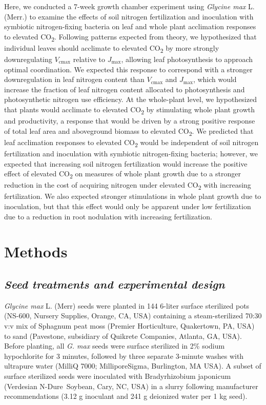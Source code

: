     Here, we conducted a 7-week growth chamber experiment using \textit{Glycine max} L. (Merr.) to examine the effects of soil nitrogen fertilization and inoculation with symbiotic nitrogen-fixing bacteria on leaf and whole plant acclimation responses to elevated CO\textsubscript{2}. Following patterns expected from theory, we hypothesized that individual leaves should acclimate to elevated CO\textsubscript{2} by more strongly downregulating $V_\mathrm{cmax}$ relative to $J_\mathrm{max}$, allowing leaf photosynthesis to approach optimal coordination. We expected this response to correspond with a stronger downregulation in leaf nitrogen content than $V_\mathrm{cmax}$ and $J_\mathrm{max}$, which would increase the fraction of leaf nitrogen content allocated to photosynthesis and photosynthetic nitrogen use efficiency. At the whole-plant level, we hypothesized that plants would acclimate to elevated CO\textsubscript{2} by stimulating whole plant growth and productivity, a response that would be driven by a strong positive response of total leaf area and aboveground biomass to elevated CO\textsubscript{2}. We predicted that leaf acclimation responses to elevated CO\textsubscript{2} would be independent of soil nitrogen fertilization and inoculation with symbiotic nitrogen-fixing bacteria; however, we expected that increasing soil nitrogen fertilization would increase the positive effect of elevated CO\textsubscript{2} on measures of whole plant growth due to a stronger reduction in the cost of acquiring nitrogen under elevated CO\textsubscript{2} with increasing fertilization. We also expected stronger stimulations in whole plant growth due to inoculation, but that this effect would only be apparent under low fertilization due to a reduction in root nodulation with increasing fertilization.

    \section{Methods}

    \subsection{\textit{Seed treatments and experimental design}}

    \textit{Glycine max} L. (Merr) seeds were planted in 144 6-liter surface sterilized pots (NS-600, Nursery Supplies, Orange, CA, USA) containing a steam-sterilized 70:30 v:v mix of Sphagnum peat moss (Premier Horticulture, Quakertown, PA, USA) to sand (Pavestone, subsidiary of Quikrete Companies, Atlanta, GA, USA). Before planting, all \textit{G. max} seeds were surface sterilized in 2\% sodium hypochlorite for 3 minutes, followed by three separate 3-minute washes with ultrapure water (MilliQ 7000; MilliporeSigma, Burlington, MA USA). A subset of surface sterilized seeds were inoculated with Bradyrhizobium japonicum (Verdesian N-Dure\texttrademark\ Soybean, Cary, NC, USA) in a slurry following manufacturer recommendations (3.12 g inoculant and 241 g deionized water per 1 kg seed).
    
